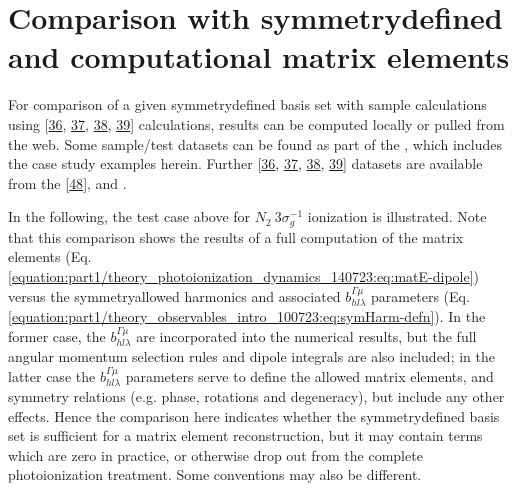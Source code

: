 \documentclass[letterpaper,table,10pt,english]{jupyterBook}
\begin{document}
\section{Comparison with symmetry\sphinxhyphen{}defined and computational matrix elements}
\label{\detokenize{part2/sym-fitting-intro_240723:comparison-with-symmetry-defined-and-computational-matrix-elements}}\label{\detokenize{part2/sym-fitting-intro_240723:sec-basis-sets-comparison-with-abinitio}}
\sphinxAtStartPar
For comparison of a given symmetry\sphinxhyphen{}defined basis set with sample  calculations using  {[}\hyperlink{cite.backmatter/bibliography:id763}{36}, \hyperlink{cite.backmatter/bibliography:id627}{37}, \hyperlink{cite.backmatter/bibliography:id804}{38}, \hyperlink{cite.backmatter/bibliography:id766}{39}{]} calculations, results can be computed locally or pulled from the web. Some sample/test datasets can be found as part of the , which includes the case study examples herein. Further  {[}\hyperlink{cite.backmatter/bibliography:id763}{36}, \hyperlink{cite.backmatter/bibliography:id627}{37}, \hyperlink{cite.backmatter/bibliography:id804}{38}, \hyperlink{cite.backmatter/bibliography:id766}{39}{]} datasets are available from the  {[}\hyperlink{cite.backmatter/bibliography:id678}{48}{]}, and .

\sphinxAtStartPar
In the following, the test case above for \(N_2~3\sigma_g^{-1}\) ionization is illustrated. Note that this comparison shows the results of a full  computation of the matrix elements (Eq. \eqref{equation:part1/theory_photoionization_dynamics_140723:eq:matE-dipole}) versus the symmetry\sphinxhyphen{}allowed harmonics and associated \(b_{hl\lambda}^{\Gamma\mu}\) parameters (Eq. \eqref{equation:part1/theory_observables_intro_100723:eq:symHarm-defn}). In the former case, the \(b_{hl\lambda}^{\Gamma\mu}\) are incorporated into the numerical results, but the full angular momentum selection rules and dipole integrals are also included; in the latter case the \(b_{hl\lambda}^{\Gamma\mu}\) parameters serve to define the allowed matrix elements, and symmetry relations (e.g. phase, rotations and degeneracy), but  include any other effects. Hence the comparison here indicates whether the symmetry\sphinxhyphen{}defined basis set is sufficient for a matrix element reconstruction, but it may contain terms which are zero in practice, or otherwise drop out from the complete photoionization treatment. Some conventions may also be different.
\end{document}

